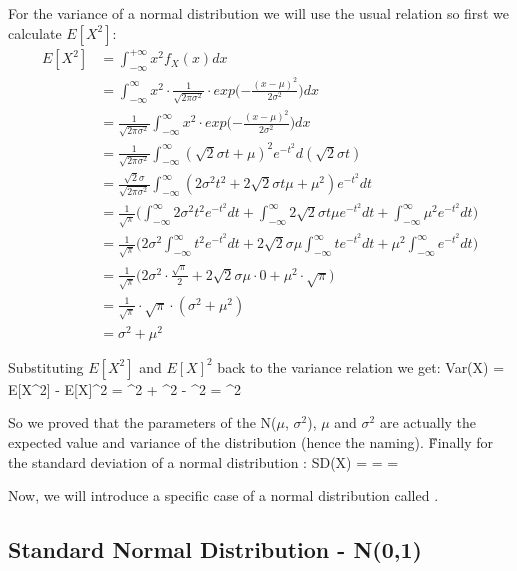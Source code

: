 For the variance of a normal distribution we will use the usual relation so first we calculate $E[X^2]$:
\begingroup
\allowdisplaybreaks
{\setlength{\jot}{11pt}
\begin{align*}
E[X^2] &= \int_{-\infty}^{+\infty} x^2 f_{X}(x) dx \\
&= \int_{-\infty}^\infty x^2 \cdot \frac{1}{\sqrt{2\pi\sigma^2}}
\cdot exp \Big( {-\frac{(x - \mu)^2}{2\sigma^2}} \Big) dx \\
&= \frac{1}{\sqrt{2\pi\sigma^2}} \int_{-\infty}^\infty x^2 \cdot exp \Big( {-\frac{(x - \mu)^2}{2\sigma^2}} \Big) dx\\
&= \frac{1}{\sqrt{2\pi\sigma^2}} \int_{-\infty}^\infty (\sqrt{2} \sigma t + \mu)^2 e^{-t^2} d (\sqrt{2} \sigma t) \\
&= \frac{\sqrt{2} \sigma}{\sqrt{2\pi\sigma^2}} \int_{-\infty}^\infty (2 \sigma^2 t^2
+ 2 \sqrt{2} \sigma t \mu + \mu^2) e ^ {-t^2} dt\\
&= \frac{1}{\sqrt{\pi}} \Big( \int_{-\infty}^\infty 2 \sigma^2 t^2 e^ {-t^2} dt
+ \int_{-\infty}^\infty 2 \sqrt{2} \sigma t \mu e ^ {-t^2} dt + \int_{-\infty}^\infty \mu^2 e^ {-t^2} dt \Big) \\
&= \frac{1}{\sqrt{\pi}} \Big( 2 \sigma^2 \int_{-\infty}^\infty t^2 e^ {-t^2} dt
+ 2 \sqrt{2} \sigma \mu \int_{-\infty}^\infty t e ^ {-t^2} dt + \mu^2 \int_{-\infty}^\infty e ^ {-t^2} dt \Big) \\
&= \frac{1}{\sqrt{\pi}} \Big( 2 \sigma^2 \cdot \frac{\sqrt{\pi}}{2} + 2 \sqrt{2} \sigma \mu \cdot 0
+ \mu^2 \cdot \sqrt{\pi} \Big) \\
&= \frac{1}{\sqrt{\pi}} \cdot \sqrt{\pi} \cdot (\sigma^2 + \mu^2 )\\
&= \sigma^2 + \mu^2
\end{align*}}
\endgroup

Substituting $E[X^2]$ and $E[X]^2$ back to the variance relation we get:
\bse
Var(X) = E[X^2] - E[X]^2 = \sigma^2 + \mu^2 - \mu^2 = \sigma^2
\ese

So we proved that the parameters of the N($\mu$, $\sigma^2$), $\mu$ and $\sigma^2$ are actually the expected value
and variance of the distribution (hence the naming). \v

Finally for the standard deviation of a normal distribution :
\bse
SD(X) =  =  = \sigma
\ese

Now, we will introduce a specific case of a normal distribution called .

\subsection{Standard Normal Distribution - N(0,1)}

